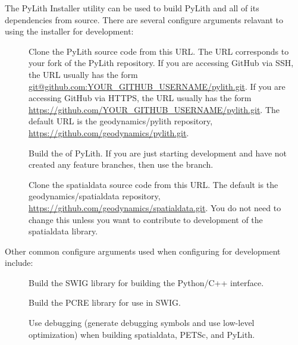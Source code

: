 The PyLith Installer utility can be used to build PyLith and all of
its dependencies from source. There are several configure arguments
relavant to using the installer for development:
\begin{description}
\item[] Clone the PyLith source
  code from this URL. The URL corresponds to your fork of the PyLith
  repository. If you are accessing GitHub via SSH, the URL usually has
  the form \url{git@github.com:YOUR_GITHUB_USERNAME/pylith.git}. If
  you are accessing GitHub via HTTPS, the URL usually has the form
  \url{https://github.com/YOUR_GITHUB_USERNAME/pylith.git}. The
  default URL is the geodynamics/pylith repository,
  \url{https://github.com/geodynamics/pylith.git}.
\item[] Build the
   of PyLith. If you are just starting development
  and have not created any feature branches, then use the
   branch.
\item[] Clone the
  spatialdata source code from this URL. The default is the
  geodynamics/spatialdata repository,
  \url{https://github.com/geodynamics/spatialdata.git}. You do not
  need to change this unless you want to contribute to development of
  the spatialdata library.
\end{description}


Other common configure arguments used when configuring for development
include:
\begin{description}
  \item[] Build the SWIG library for
    building the Python/C++ interface.
  \item[] Build the PCRE library for use
    in SWIG.
  \item[] Use debugging (generate
    debugging symbols and use low-level optimization) when building
    spatialdata, PETSc, and PyLith.
\end{description}


